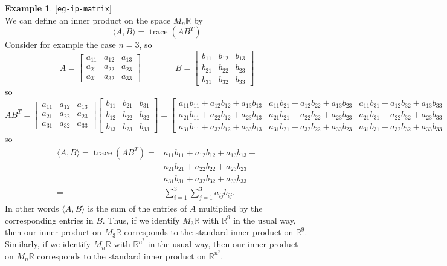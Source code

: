 \documentclass{amsart}
\newcommand{\lbl}[1]{\label{#1}\textup{[\texttt{#1}]}\ \\}
\newcommand{\lbl}{\label}
\newcommand{\R}         {{\mathbb{R}}}
\newcommand{\trc}       {\operatorname{trace}}
\newcommand{\bsm}       {\left[\begin{smallmatrix}}
\newcommand{\esm}       {\end{smallmatrix}\right]}
\newcommand{\ip}[1]     {\langle #1\rangle}
\renewcommand{\:}       {\colon}
\theoremstyle{definition}
\newtheorem{example}[theorem]{Example}
\begin{document}
\begin{example}\lbl{eg-ip-matrix}
 We can define an inner product on the space $M_n\R$ by 
 \[ \ip{A,B} = \trc(AB^T) \]
 Consider for example the case $n=3$, so 
 \[ A = \bsm a_{11} & a_{12} & a_{13} \\
             a_{21} & a_{22} & a_{23} \\
             a_{31} & a_{32} & a_{33} \esm 
    \hspace{4em}
    B = \bsm b_{11} & b_{12} & b_{13} \\
             b_{21} & b_{22} & b_{23} \\
             b_{31} & b_{32} & b_{33} \esm 
 \]
 so 
 {\tiny \[ AB^T =
        \bsm a_{11} & a_{12} & a_{13} \\
             a_{21} & a_{22} & a_{23} \\
             a_{31} & a_{32} & a_{33} \esm 
        \bsm b_{11} & b_{21} & b_{31} \\
             b_{12} & b_{22} & b_{32} \\
             b_{13} & b_{23} & b_{33} \esm 
         =
        \bsm 
         a_{11}b_{11} + a_{12}b_{12} + a_{13}b_{13} &
         a_{11}b_{21} + a_{12}b_{22} + a_{13}b_{23} &
         a_{11}b_{31} + a_{12}b_{32} + a_{13}b_{33} \\
         a_{21}b_{11} + a_{22}b_{12} + a_{23}b_{13} &
         a_{21}b_{21} + a_{22}b_{22} + a_{23}b_{23} &
         a_{21}b_{31} + a_{22}b_{32} + a_{23}b_{33} \\
         a_{31}b_{11} + a_{32}b_{12} + a_{33}b_{13} &
         a_{31}b_{21} + a_{32}b_{22} + a_{33}b_{23} &
         a_{31}b_{31} + a_{32}b_{32} + a_{33}b_{33}
        \esm
 \]}
 so 
 \begin{align*}
  \ip{A,B} = \trc(AB^T) = 
  & a_{11}b_{11} + a_{12}b_{12} + a_{13}b_{13} + \\
  & a_{21}b_{21} + a_{22}b_{22} + a_{23}b_{23} + \\
  & a_{31}b_{31} + a_{32}b_{32} + a_{33}b_{33}   \\
  = & \sum_{i=1}^3 \sum_{j=1}^3 a_{ij}b_{ij}.
 \end{align*}
 In other words $\ip{A,B}$ is the sum of the entries of $A$
 multiplied by the corresponding entries in $B$.  Thus, if
 we identify $M_3\R$ with $\R^9$ in the usual way, then our
 inner product on $M_3\R$ corresponds to the standard inner
 product on $\R^9$.  Similarly, if we identify $M_n\R$ with
 $\R^{n^2}$ in the usual way, then our inner product on
 $M_n\R$ corresponds to the standard inner product on
 $\R^{n^2}$.
\end{example}
\end{document}

